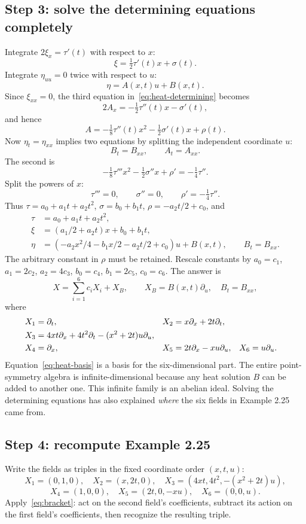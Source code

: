 \documentclass[11pt,a4paper]{article}
\numberwithin{equation}{section}
\theoremstyle{definition}
\theoremstyle{plain}
\theoremstyle{remark}
\begin{document}
\subsection{Step 3: solve the determining equations completely}
Integrate $2\xi_x=\tau'(t)$ with respect to $x$:
\[
\xi=\tfrac12\tau'(t)x+\sigma(t).
\]
Integrate $\eta_{uu}=0$ twice with respect to $u$:
\[
\eta=A(x,t)u+B(x,t).
\]
Since $\xi_{xx}=0$, the third equation in~\eqref{eq:heat-determining} becomes
\[
2A_x=-\tfrac12\tau''(t)x-\sigma'(t),
\]
and hence
\begin{equation}\label{eq:heat-A}
A=-\tfrac18\tau''(t)x^2-\tfrac12\sigma'(t)x+\rho(t).
\end{equation}
Now $\eta_t=\eta_{xx}$ implies two equations by splitting the independent coordinate $u$:
\[
B_t=B_{xx},\qquad A_t=A_{xx}.
\]
The second is
\[
-\tfrac18\tau'''x^2-\tfrac12\sigma''x+\rho'=-\tfrac14\tau''.
\]
Split the powers of $x$:
\[
\tau'''=0,\qquad\sigma''=0,\qquad\rho'=-\tfrac14\tau''.
\]
Thus $\tau=a_0+a_1t+a_2t^2$, $\sigma=b_0+b_1t$, $\rho=-a_2t/2+c_0$, and
\begin{align*}
\tau&=a_0+a_1t+a_2t^2,\\
\xi&=(a_1/2+a_2t)x+b_0+b_1t,\\
\eta&=(-a_2x^2/4-b_1x/2-a_2t/2+c_0)u+B(x,t),\qquad B_t=B_{xx}.
\end{align*}
The arbitrary constant in $\rho$ must be retained. Rescale constants by $a_0=c_1$, $a_1=2c_2$, $a_2=4c_3$, $b_0=c_4$, $b_1=2c_5$, $c_0=c_6$. The answer is
\[
\boxed{X=\sum_{i=1}^6 c_iX_i+X_B,\qquad X_B=B(x,t)\partial_u,\quad B_t=B_{xx},}
\]
where
\begin{align}
X_1&=\partial_t,& X_2&=x\partial_x+2t\partial_t,\notag\\
X_3&=4xt\partial_x+4t^2\partial_t-(x^2+2t)u\partial_u,\label{eq:heat-basis}\\
X_4&=\partial_x,&X_5&=2t\partial_x-xu\partial_u,&X_6&=u\partial_u.\notag
\end{align}
Equation~\eqref{eq:heat-basis} is a basis for the six-dimensional part. The entire point-symmetry algebra is infinite-dimensional because any heat solution $B$ can be added to another one. This infinite family is an abelian ideal. Solving the determining equations has also explained \emph{where} the six fields in Example 2.25 came from.

\subsection{Step 4: recompute Example 2.25}\label{sec:heat-brackets}
Write the fields as triples in the fixed coordinate order $(x,t,u)$:
\[
X_1=(0,1,0),\quad X_2=(x,2t,0),\quad X_3=(4xt,4t^2,-(x^2+2t)u),
\]
\[
X_4=(1,0,0),\quad X_5=(2t,0,-xu),\quad X_6=(0,0,u).
\]
Apply~\eqref{eq:bracket}: act on the second field's coefficients, subtract its action on the first field's coefficients, then recognize the resulting triple.
\end{document}
